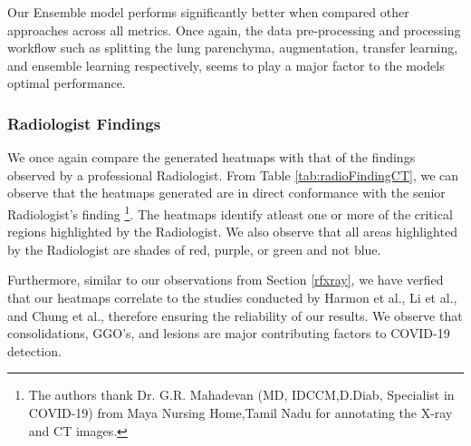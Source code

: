 Our Ensemble model performs significantly better when compared other approaches across all metrics. Once again, the data pre-processing and processing workflow such as splitting the lung parenchyma, augmentation, transfer learning, and ensemble learning respectively, seems to play a major factor to the models optimal performance.


\subsubsection{Radiologist Findings}

We once again compare the generated heatmaps with that of the findings observed by a professional Radiologist. From Table \ref{tab:radioFindingCT}, we can observe that the heatmaps generated are in direct conformance with the senior Radiologist's finding \footnote{The authors thank Dr. G.R. Mahadevan (MD, IDCCM,D.Diab, Specialist in COVID-19) from Maya Nursing Home,Tamil Nadu for annotating the X-ray and CT images.}. The heatmaps identify atleast one or more of the critical regions highlighted by the Radiologist. We also observe that all areas highlighted by the Radiologist are shades of red, purple, or green and not blue. 

Furthermore, similar to our observations from Section \ref{rfxray}, we have verfied that our heatmaps correlate to the studies conducted by Harmon et al., Li et al., and Chung et al., therefore ensuring the reliability of our results. We observe that consolidations, GGO's, and lesions are major contributing factors to COVID-19 detection.

